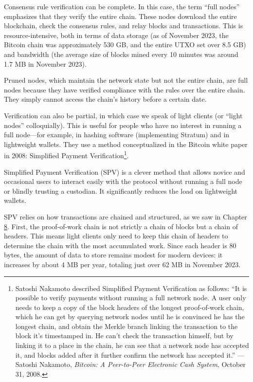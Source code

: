 \documentclass[
  a5paper,
  smalldemyvopaper,10pt,twoside,onecolumn,openright,extrafontsizes,hidelinks]{memoir}
\begin{document}
Consensus rule verification can be complete. In this case, the term
``full nodes'' emphasizes that they verify the entire chain. These nodes
download the entire blockchain, check the consensus rules, and relay
blocks and transactions. This is resource-intensive, both in terms of
data storage (as of November 2023, the Bitcoin chain was approximately
530 GB, and the entire UTXO set over 8.5 GB) and bandwidth (the average
size of blocks mined every 10 minutes was around 1.7 MB in November
2023).

Pruned nodes, which maintain the network state but not the entire chain,
are full nodes because they have verified compliance with the rules over
the entire chain. They simply cannot access the chain's history before a
certain date.

Verification can also be partial, in which case we speak of light
clients (or ``light nodes'' colloquially). This is useful for people who
have no interest in running a full node---for example, in hashing
software (implementing Stratum) and in lightweight wallets. They use a
method conceptualized in the Bitcoin white paper in 2008: Simplified
Payment Verification\footnote{Satoshi Nakamoto described Simplified
  Payment Verification as follows: ``It is possible to verify payments
  without running a full network node. A user only needs to keep a copy
  of the block headers of the longest proof-of-work chain, which he can
  get by querying network nodes until he is convinced he has the longest
  chain, and obtain the Merkle branch linking the transaction to the
  block it's timestamped in. He can't check the transaction himself, but
  by linking it to a place in the chain, he can see that a network node
  has accepted it, and blocks added after it further confirm the network
  has accepted it.'' --- Satoshi Nakamoto, \emph{Bitcoin: A Peer-to-Peer
  Electronic Cash System}, October 31, 2008.}.

Simplified Payment Verification (SPV) is a clever method that allows
novice and occasional users to interact easily with the protocol without
running a full node or blindly trusting a custodian. It significantly
reduces the load on lightweight wallets.

SPV relies on how transactions are chained and structured, as we saw in
Chapter \hyperref[ch:confirmation]{8}. First, the proof-of-work chain is
not strictly a chain of blocks but a chain of headers. This means light
clients only need to keep this chain of headers to determine the chain
with the most accumulated work. Since each header is 80 bytes, the
amount of data to store remains modest for modern devices: it increases
by about 4 MB per year, totaling just over 62 MB in November 2023.
\end{document}
